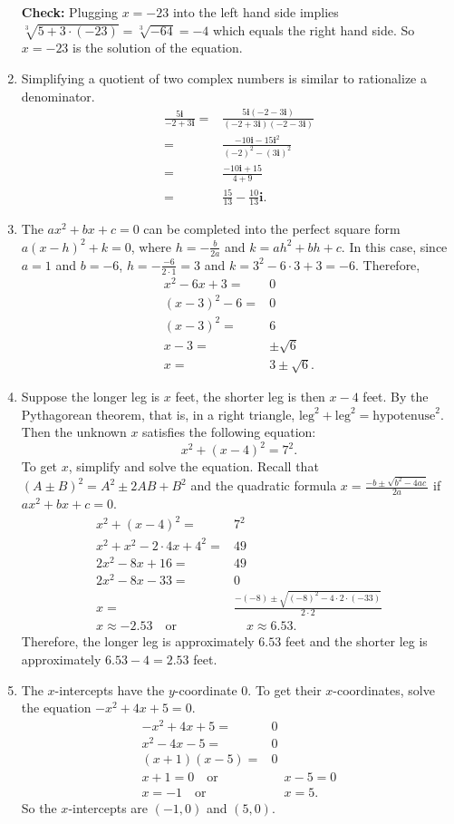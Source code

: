 \documentclass[
  12pt]{article}
\begin{document}
\begin{enumerate}
  \textbf{Check:} Plugging \(x=-23\) into the left hand side implies
  \(\sqrt[3]{5+3\cdot(-23)}=\sqrt[3]{-64}=-4\) which equals the right
  hand side. So \(x=-23\) is the solution of the equation.
\item
  Simplifying a quotient of two complex numbers is similar to
  rationalize a denominator. \[
  \begin{aligned}
  \frac{5\mathbf{i}}{-2+3\mathbf{i}}=&\frac{5\mathbf{i}(-2-3\mathbf{i})}{(-2+3\mathbf{i})(-2-3\mathbf{i})}\\
  =&\frac{-10\mathbf{i}-15\mathbf{i}^2}{(-2)^2-(3\mathbf{i})^2}\\
  =&\frac{-10\mathbf{i}+15}{4+9}\\
  =&\frac{15}{13}-\frac{10}{13}\mathbf{i}.
  \end{aligned}
  \]
\item
  The \(ax^2+bx+c=0\) can be completed into the perfect square form
  \(a(x-h)^2+k=0\), where \(h=-\frac{b}{2a}\) and \(k=ah^2+bh+c\). In
  this case, since \(a=1\) and \(b=-6\), \(h=-\frac{-6}{2\cdot 1}=3\)
  and \(k=3^2-6\cdot 3+3=-6\). Therefore, \[
  \begin{aligned}
  x^2-6x+3=&0\\
  (x-3)^2-6=&0\\
  (x-3)^2=&6\\
  x-3=&\pm\sqrt{6}\\
  x=&3\pm\sqrt{6}.
  \end{aligned}
  \]
\item
  Suppose the longer leg is \(x\) feet, the shorter leg is then \(x-4\)
  feet. By the Pythagorean theorem, that is, in a right triangle,
  \(\text{leg}^2+\text{leg}^2=\text{hypotenuse}^2\). Then the unknown
  \(x\) satisfies the following equation: \[x^2+(x-4)^2=7^2.\] To get
  \(x\), simplify and solve the equation. Recall that
  \((A\pm B)^2=A^2\pm 2AB+B^2\) and the quadratic formula
  \(x=\frac{-b\pm\sqrt{b^2-4ac}}{2a}\) if \(ax^2+bx+c=0\). \[
  \begin{aligned}
  x^2+(x-4)^2=&7^2\\
  x^2+x^2-2\cdot 4x+4^2=&49\\
  2x^2-8x+16=&49\\
  2x^2-8x-33=&0\\
  x=&\frac{-(-8)\pm\sqrt{(-8)^2-4\cdot2\cdot(-33)}}{2\cdot 2}\\
  x\approx -2.53\quad\text{or}&\quad x\approx 6.53.
  \end{aligned}
  \] Therefore, the longer leg is approximately \(6.53\) feet and the
  shorter leg is approximately \(6.53-4=2.53\) feet.
\item
  The \(x\)-intercepts have the \(y\)-coordinate \(0\). To get their
  \(x\)-coordinates, solve the equation \(-x^2+4x+5=0\). \[
  \begin{aligned}
  -x^2+4x+5=&0\\
  x^2-4x-5=&0\\
  (x+1)(x-5)=&0\\
  x+1=0\quad\text{or}&\quad x-5=0\\
  x=-1\quad\text{or}&\quad x=5.
  \end{aligned}
  \] So the \(x\)-intercepts are \((-1, 0)\) and \((5, 0)\).


\end{enumerate}
\end{document}
